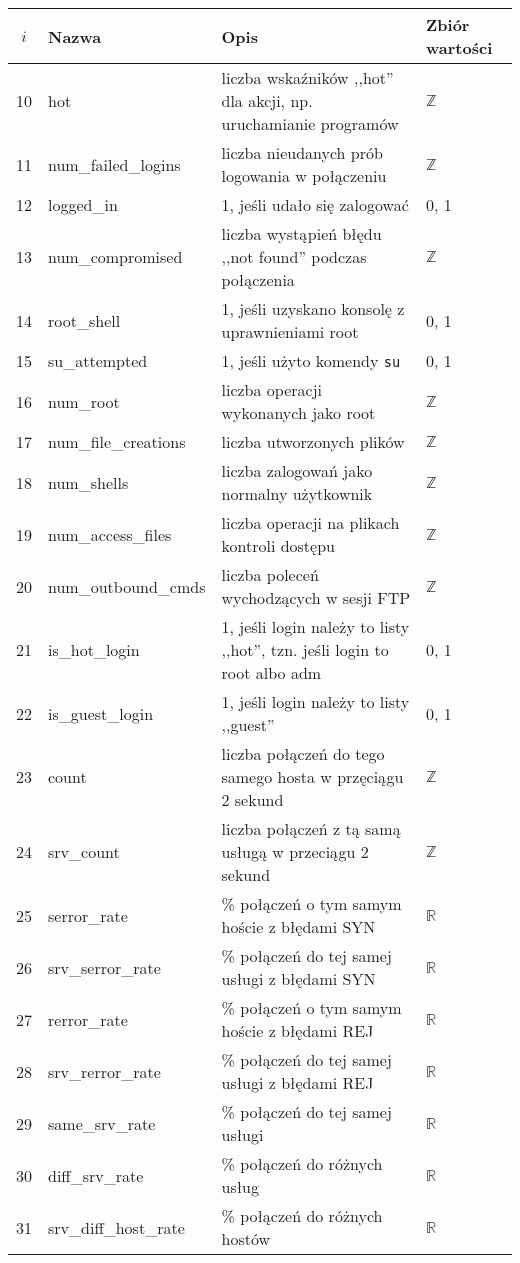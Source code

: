 \documentclass[a4paper, 12pt]{article}
\begin{document}
\begin{tabular}{ | c | l | p{} | p{} | } \hline
$i$ & Nazwa & Opis & Zbiór wartości \\ \hline
10      & hot & liczba wskaźników ,,hot'' dla akcji, np. uruchamianie programów & $\mathbb{Z}$ \\ \hline
11      & num\_failed\_logins  & liczba nieudanych prób logowania w połączeniu & $\mathbb{Z}$ \\ \hline
12      & logged\_in  & 1, jeśli udało się zalogować &  0, 1 \\ \hline
13      & num\_compromised & liczba wystąpień błędu ,,not found'' podczas połączenia &  $\mathbb{Z}$ \\ \hline
14      & root\_shell  & 1, jeśli uzyskano konsolę z uprawnieniami root  &  0, 1 \\ \hline
15      & su\_attempted  & 1, jeśli użyto komendy \texttt{su} &  0, 1 \\ \hline
16      & num\_root  & liczba operacji wykonanych jako root  & $\mathbb{Z}$ \\ \hline
17      & num\_file\_creations  & liczba utworzonych plików  & $\mathbb{Z}$ \\ \hline
18      & num\_shells  & liczba zalogowań jako normalny użytkownik & $\mathbb{Z}$ \\ \hline
19      & num\_access\_files  & liczba operacji na plikach kontroli dostępu & $\mathbb{Z}$ \\ \hline
20      & num\_outbound\_cmds & liczba poleceń wychodzących w sesji FTP & $\mathbb{Z}$ \\ \hline
21      & is\_hot\_login  & 1, jeśli login należy to listy ,,hot'', tzn. jeśli login to root albo adm &  0, 1 \\ \hline
22      & is\_guest\_login  & 1, jeśli login należy to listy ,,guest'' &  0, 1 \\ \hline
23     & count & liczba połączeń do tego samego hosta w przęciągu 2 sekund & $\mathbb{Z}$ \\ \hline
24      & srv\_count   & liczba połączeń z tą samą usługą w przeciągu 2 sekund &  $\mathbb{Z}$ \\ \hline
25      & serror\_rate        & \% połączeń o tym samym hoście z błędami SYN  & $\mathbb{R}$ \\ \hline
26      & srv\_serror\_rate   & \% połączeń do tej samej usługi z błędami SYN & $\mathbb{R}$ \\ \hline
27      & rerror\_rate        & \% połączeń o tym samym hoście z błędami REJ   & $\mathbb{R}$ \\ \hline
28      & srv\_rerror\_rate   & \% połączeń do tej samej usługi z błędami REJ  & $\mathbb{R}$ \\ \hline
29      & same\_srv\_rate     & \% połączeń do tej samej usługi  &  $\mathbb{R}$ \\ \hline
30      & diff\_srv\_rate     & \% połączeń do różnych usług &  $\mathbb{R}$ \\ \hline  
31      & srv\_diff\_host\_rate   & \% połączeń do różnych hostów   & $\mathbb{R}$ \\ \hline
\end{tabular}
\end{document}
